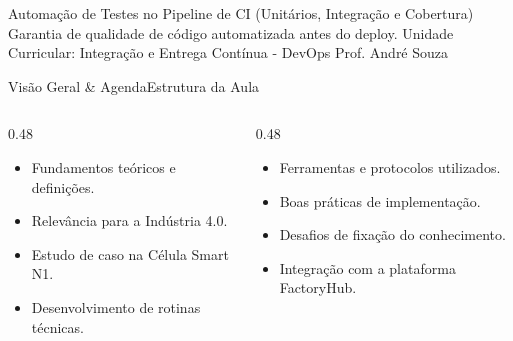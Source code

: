 
\senaicover
  {Automação de Testes no Pipeline de CI (Unitários, Integração e Cobertura)}
  {Garantia de qualidade de código automatizada antes do deploy.}
  {Unidade Curricular: Integração e Entrega Contínua - DevOps}
  {Prof. André Souza}

\begin{senaiframe}{Visão Geral \& Agenda}{Estrutura da Aula}
  \begin{columns}[t]
    \begin{column}{0.48\textwidth}
      \begin{tcolorbox}[senaibluecard, title={1. Conceitos Chave}]
        \begin{itemize}
          \item Fundamentos teóricos e definições.
          \item Relevância para a Indústria 4.0.
        \end{itemize}
      \end{tcolorbox}
      \vspace{4pt}
      \begin{tcolorbox}[senaiambercard, title={3. Aplicação Prática}]
        \begin{itemize}
          \item Estudo de caso na Célula Smart N1.
          \item Desenvolvimento de rotinas técnicas.
        \end{itemize}
      \end{tcolorbox}
    \end{column}
    \begin{column}{0.48\textwidth}
      \begin{tcolorbox}[senairedcard, title={2. Detalhamento Técnico}]
        \begin{itemize}
          \item Ferramentas e protocolos utilizados.
          \item Boas práticas de implementação.
        \end{itemize}
      \end{tcolorbox}
      \vspace{4pt}
      \begin{tcolorbox}[senaigreencard, title={4. Exercícios \& Avaliação}]
        \begin{itemize}
          \item Desafios de fixação do conhecimento.
          \item Integração com a plataforma FactoryHub.
        \end{itemize}
      \end{tcolorbox}
    \end{column}
  \end{columns}
\end{senaiframe}

